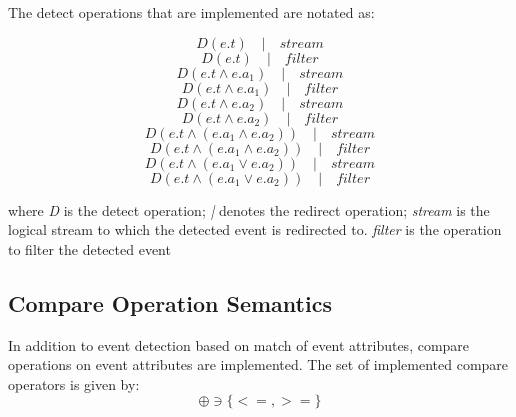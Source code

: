 \begin{flushleft}
The detect operations that are implemented are notated as:

\begin{equation}
D(e.t) \quad | \quad stream
\end{equation}
\begin{equation}
D(e.t) \quad | \quad filter
\end{equation}
\begin{equation}
D(e.t  \wedge e.a_1) \quad | \quad stream
\end{equation}
\begin{equation}
D(e.t  \wedge e.a_1) \quad | \quad filter
\end{equation}
\begin{equation}
D(e.t  \wedge e.a_2) \quad | \quad stream
\end{equation}
\begin{equation}
D(e.t  \wedge e.a_2) \quad | \quad filter
\end{equation}
\begin{equation}
D(e.t  \wedge (e.a_1 \wedge e.a_2)) \quad | \quad stream
\end{equation}
\begin{equation}
D(e.t  \wedge (e.a_1 \wedge e.a_2)) \quad | \quad filter
\end{equation}
\begin{equation}	
D(e.t  \wedge (e.a_1  \vee e.a_2 )) \quad | \quad stream
\end{equation}
\begin{equation}	
D(e.t  \wedge (e.a_1  \vee e.a_2 )) \quad | \quad filter
\end{equation}

where \textit{D} is the detect operation; \newline
\textit{|} denotes the redirect operation; \newline
\textit{stream} is the logical stream to which the detected event is redirected to.\newline
\textit{filter} is the operation to filter the detected event \newline \newline
\end{flushleft}


\subsection{Compare Operation Semantics}
In addition to event detection based on match of event attributes, compare operations on event attributes are implemented. The set of implemented compare operators is given by:
\begin{equation}
\oplus  \ni  \lbrace <=,>= \rbrace
\end{equation}


